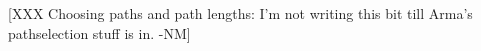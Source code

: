 \documentclass[times,10pt,twocolumn]{article}
\begin{document}
[XXX Choosing paths and path lengths: I'm not writing this bit till
  Arma's pathselection stuff is in. -NM]

%
\end{document}
